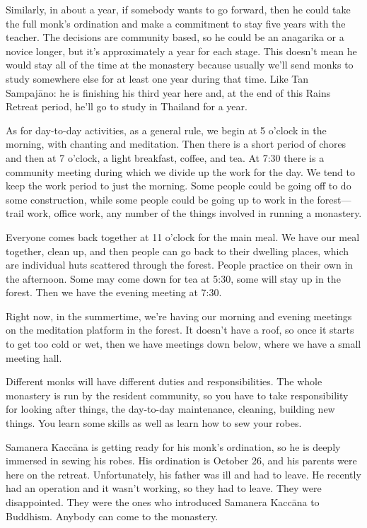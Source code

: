 Similarly, in about a year, if somebody wants to go forward, then he
could take the full monk’s ordination and make a commitment to stay five
years with the teacher. The decisions are community based, so he could
be an anagarika or a novice longer, but it’s approximately a year for
each stage. This doesn’t mean he would stay all of the time at the
monastery because usually we’ll send monks to study somewhere else for
at least one year during that time. Like Tan Sampajāno: he is finishing
his third year here and, at the end of this Rains Retreat period, he’ll
go to study in Thailand for a year.

As for day-to-day activities, as a general rule, we begin at 5 o’clock
in the morning, with chanting and meditation. Then there is a short
period of chores and then at 7 o’clock, a light breakfast, coffee, and
tea. At 7:30 there is a community meeting during which we divide up the
work for the day. We tend to keep the work period to just the morning.
Some people could be going off to do some construction, while some
people could be going up to work in the forest—trail work, office work,
any number of the things involved in running a monastery.

Everyone comes back together at 11 o’clock for the main meal. We have
our meal together, clean up, and then people can go back to their
dwelling places, which are individual huts scattered through the forest.
People practice on their own in the afternoon. Some may come down for
tea at 5:30, some will stay up in the forest. Then we have the evening
meeting at 7:30.

Right now, in the summertime, we’re having our morning and evening
meetings on the meditation platform in the forest. It doesn’t have a
roof, so once it starts to get too cold or wet, then we have meetings
down below, where we have a small meeting hall.

Different monks will have different duties and responsibilities. The
whole monastery is run by the resident community, so you have to take
responsibility for looking after things, the day-to-day maintenance,
cleaning, building new things. You learn some skills as well as learn
how to sew your robes.

Samanera Kaccāna is getting ready for his monk’s ordination, so he is
deeply immersed in sewing his robes. His ordination is October 26, and
his parents were here on the retreat. Unfortunately, his father was ill
and had to leave. He recently had an operation and it wasn’t working, so
they had to leave. They were disappointed. They were the ones who
introduced Samanera Kaccāna to Buddhism. Anybody can come to the
monastery.

